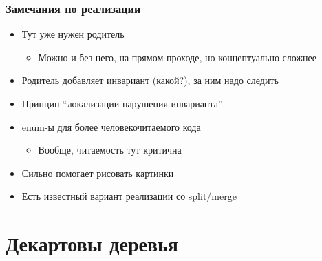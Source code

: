 \documentclass[xetex,mathserif,serif]{beamer}
\begin{document}
    \begin{frame}
        \frametitle{Замечания по реализации}
        \begin{itemize}
            \item Тут уже нужен родитель
            \begin{itemize}
                \item Можно и без него, на прямом проходе, но концептуально сложнее
            \end{itemize}
            \item Родитель добавляет инвариант (какой?), за ним надо следить
            \item Принцип ``локализации нарушения инварианта''
            \item enum-ы для более человекочитаемого кода
            \begin{itemize}
                \item Вообще, читаемость тут критична
            \end{itemize}
            \item Сильно помогает рисовать картинки
            \item Есть известный вариант реализации со split/merge
        \end{itemize}
    \end{frame}

    \section{Декартовы деревья}
\end{document}

